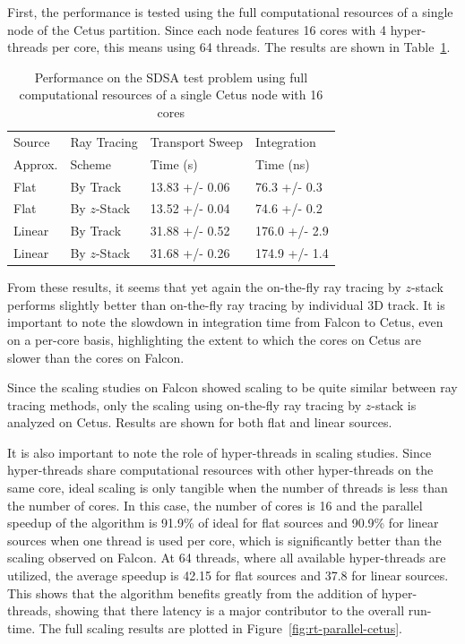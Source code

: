 First, the performance is tested using the full computational resources of a single node of the Cetus partition. Since each node features 16 cores with 4 hyper-threads per core, this means using 64 threads. The results are shown in Table~\ref{tab:rt-full-thread-cetus}.

\begin{table}[ht]
	\centering
	\caption{Performance on the SDSA test problem using full computational resources of a single Cetus node with 16 cores}
	\medskip
	\begin{tabular}{l|l|l|l}
		\hline
		Source &  Ray Tracing & Transport Sweep & Integration \\
		Approx. &  Scheme & Time (s) & Time (ns) \\
		\hline
		Flat & By Track & 13.83 +/- 0.06 & 76.3 +/- 0.3 \\
		Flat & By $z$-Stack & 13.52 +/- 0.04 & 74.6 +/- 0.2 \\
		Linear & By Track & 31.88 +/- 0.52 & 176.0 +/- 2.9 \\
		Linear & By $z$-Stack & 31.68 +/- 0.26 & 174.9 +/- 1.4 \\
		\hline
	\end{tabular}
	\label{tab:rt-full-thread-cetus}
\end{table}

From these results, it seems that yet again the on-the-fly ray tracing by $z$-stack performs slightly better than on-the-fly ray tracing by individual 3D track. It is important to note the slowdown in integration time from Falcon to Cetus, even on a per-core basis, highlighting the extent to which the cores on Cetus are slower than the cores on Falcon. 

Since the scaling studies on Falcon showed scaling to be quite similar between ray tracing methods, only the scaling using on-the-fly ray tracing by $z$-stack is analyzed on Cetus. Results are shown for both flat and linear sources.

It is also important to note the role of hyper-threads in scaling studies. Since hyper-threads share computational resources with other hyper-threads on the same core, ideal scaling is only tangible when the number of threads is less than the number of cores. In this case, the number of cores is 16 and the parallel speedup of the algorithm is 91.9\% of ideal for flat sources and 90.9\% for linear sources when one thread is used per core, which is significantly better than the scaling observed on Falcon. At 64 threads, where all available hyper-threads are utilized, the average speedup is 42.15 for flat sources and 37.8 for linear sources. This shows that the algorithm benefits greatly from the addition of hyper-threads, showing that there latency is a major contributor to the overall run-time. The full scaling results are plotted in Figure~\ref{fig:rt-parallel-cetus}.

